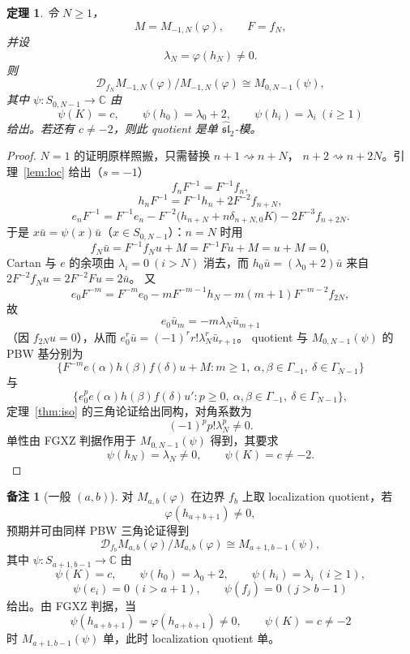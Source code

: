 \documentclass[UTF8,11pt]{ctexart}
\newcommand{\C}{\mathbb C}
\newcommand{\G}{\Gamma}
\newcommand{\slh}{\widehat{\mathfrak{sl}}_2}
\newcommand{\D}{\mathcal D}
\theoremstyle{plain}
\newtheorem{theorem}[proposition]{定理}
\theoremstyle{definition}
\newtheorem{remark}[proposition]{备注}
\begin{document}
\begin{theorem}\label{thm:general}
令 \(N\ge1\)，
\[
  M=M_{-1,N}(\varphi),\qquad F=f_N,
\]
并设
\[
  \lambda_N=\varphi(h_N)\ne0.
\]
则
\[
  \D_{f_N}M_{-1,N}(\varphi)/M_{-1,N}(\varphi)
  \cong
  M_{0,N-1}(\psi),
\]
其中 \(\psi:S_{0,N-1}\to\C\) 由
\[
  \psi(K)=c,\qquad
  \psi(h_0)=\lambda_0+2,\qquad
  \psi(h_i)=\lambda_i\ (i\ge1)
\]
给出。若还有 \(c\ne-2\)，则此 quotient 是单 \(\slh\)-模。
\end{theorem}

\begin{proof}
\(N=1\) 的证明原样照搬，只需替换 \(n+1\rightsquigarrow n+N\)，
\(n+2\rightsquigarrow n+2N\)。引理~\ref{lem:loc} 给出（\(s=-1\)）
\[
  f_nF^{-1}=F^{-1}f_n,
\]
\[
  h_nF^{-1}=F^{-1}h_n+2F^{-2}f_{n+N},
\]
\[
  e_nF^{-1}
  =
  F^{-1}e_n
  -F^{-2}\bigl(h_{n+N}+n\delta_{n+N,0}K\bigr)
  -2F^{-3}f_{n+2N}.
\]
于是 \(x\bar u=\psi(x)\bar u\)（\(x\in S_{0,N-1}\)）：\(n=N\) 时用
\[
  f_N\bar u=F^{-1}f_Nu+M=F^{-1}Fu+M=u+M=0,
\]
Cartan 与 \(e\) 的余项由 \(\lambda_i=0\ (i>N)\) 消去，而
\(h_0\bar u=(\lambda_0+2)\bar u\) 来自 \(2F^{-2}f_Nu=2F^{-2}Fu=2\bar u\)。
又
\[
  e_0F^{-m}=F^{-m}e_0-mF^{-m-1}h_N-m(m+1)F^{-m-2}f_{2N},
\]
故
\[
  e_0\bar u_m=-m\lambda_N\bar u_{m+1}
\]
（因 \(f_{2N}u=0\)），从而 \(e_0^r\bar u=(-1)^rr!\lambda_N^r\bar u_{r+1}\)。
quotient 与 \(M_{0,N-1}(\psi)\) 的 PBW 基分别为
\[
  \{F^{-m}e(\alpha)h(\beta)f(\delta)u+M:
  m\ge1,\ \alpha,\beta\in\G_{-1},\ \delta\in\G_{N-1}\}
\]
与
\[
  \{e_0^pe(\alpha)h(\beta)f(\delta)u':
  p\ge0,\ \alpha,\beta\in\G_{-1},\ \delta\in\G_{N-1}\},
\]
定理~\ref{thm:iso} 的三角论证给出同构，对角系数为
\[
  (-1)^pp!\lambda_N^p\ne0.
\]
单性由 FGXZ 判据作用于 \(M_{0,N-1}(\psi)\) 得到，其要求
\[
  \psi(h_N)=\lambda_N\ne0,\qquad \psi(K)=c\ne-2.
\]
\end{proof}

\begin{remark}[一般 \((a,b)\)]
对 \(M_{a,b}(\varphi)\) 在边界 \(f_b\) 上取 localization quotient，若
\[
  \varphi(h_{a+b+1})\ne0,
\]
预期并可由同样 PBW 三角论证得到
\[
  \D_{f_b}M_{a,b}(\varphi)/M_{a,b}(\varphi)
  \cong
  M_{a+1,b-1}(\psi),
\]
其中 \(\psi:S_{a+1,b-1}\to\C\) 由
\[
  \psi(K)=c,\qquad
  \psi(h_0)=\lambda_0+2,\qquad
  \psi(h_i)=\lambda_i\ (i\ge1),
\]
\[
  \psi(e_i)=0\ (i>a+1),\qquad \psi(f_j)=0\ (j>b-1)
\]
给出。由 FGXZ 判据，当
\[
  \psi(h_{a+b+1})=\varphi(h_{a+b+1})\ne0,\qquad \psi(K)=c\ne-2
\]
时 \(M_{a+1,b-1}(\psi)\) 单，此时 localization quotient 单。
\end{remark}
\end{document}

